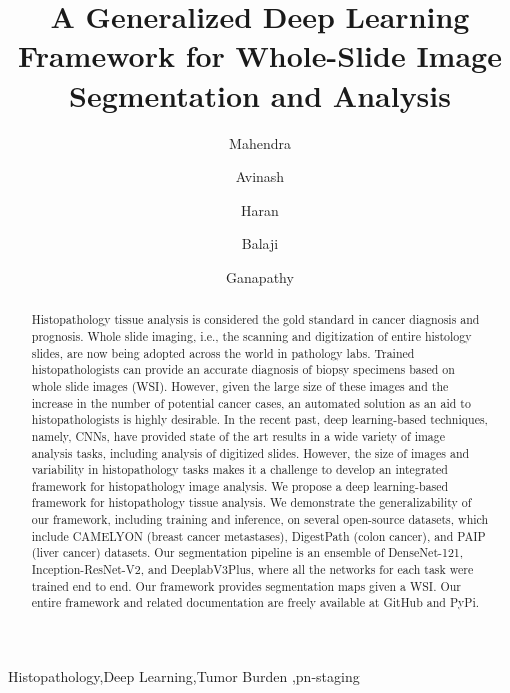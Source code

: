 \documentclass[times,twocolumn,final,authoryear]{tmp}
\begin{document}
\thispagestyle{empty}

\ifpreprint
  \setcounter{page}{1}
\else
  \setcounter{page}{1}
\fi

\begin{frontmatter}

\title{A Generalized Deep Learning Framework for Whole-Slide Image Segmentation and Analysis}


\author[1,3]{Mahendra } 
\author[1,3]{Avinash }
\author[1,3]{Haran }
\author[2]{Balaji }
\author[1]{Ganapathy }
\address[1]{Department of Engineering Design, Indian Institute of Technology Madras, 600036 India}
\address[2]{Department of Mechanical Engineering, Indian Institute of Technology Madras, 600036 India}
\address[3]{Authors contributed equally}



\begin{abstract}
Histopathology tissue analysis is considered the gold standard in cancer diagnosis and prognosis. Whole slide imaging, i.e., the scanning and digitization of entire histology slides, are now being adopted across the world in pathology labs. Trained histopathologists can provide an accurate diagnosis of biopsy specimens based on whole slide images (WSI). However, given the large size of these images and the increase in the number of potential cancer cases, an automated solution as an aid to histopathologists is highly desirable. In the recent past, deep learning-based techniques, namely, CNNs, have provided state of the art results in a wide variety of image analysis tasks, including analysis of digitized slides. However, the size of images and variability in histopathology tasks makes it a challenge to develop an integrated framework for histopathology image analysis. We propose a deep learning-based framework for histopathology tissue analysis. We demonstrate the generalizability of our framework, including training and inference, on several open-source datasets, which include CAMELYON (breast cancer metastases), DigestPath (colon cancer), and PAIP (liver cancer) datasets. Our segmentation pipeline is an ensemble of DenseNet-121, Inception-ResNet-V2, and DeeplabV3Plus, where all the networks for each task were trained end to end. Our framework provides segmentation maps given a WSI. Our entire framework and related documentation are freely available at GitHub and PyPi.
\end{abstract}

\begin{keyword}
\KWD Histopathology\sep Deep Learning\sep Tumor Burden \sep pn-staging


\end{keyword}

\end{frontmatter}
\end{document}
